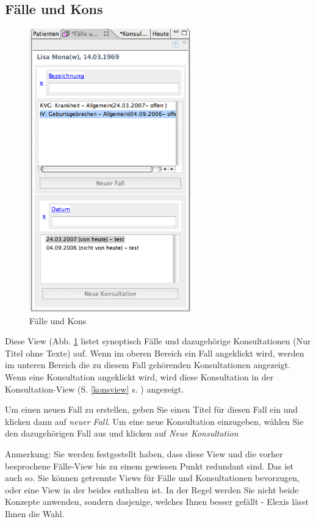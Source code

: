 \subsection{Fälle und Kons}
\begin{figure}
  \includegraphics[width=7cm]{images/fallkonsview}
  \caption{Fälle und Kons}
  \label{fig:fallkons}
\end{figure}
Diese View (Abb. \ref{fig:fallkons} listet synoptisch Fälle und dazugehörige
Konsultationen (Nur Titel ohne Texte) auf. Wenn im oberen Bereich ein Fall
angeklickt wird, werden im unteren Bereich die zu diesem Fall gehörenden
Konsultationen angezeigt. Wenn eine Konsultation angeklickt wird, wird diese
Konsultation in der Konsultation-View (S. \ref{konsview} s. \pageref{konsview}) angezeigt.

Um einen neuen Fall zu erstellen, geben Sie einen Titel für diesen Fall ein und klicken dann auf \textit{neuer Fall}. Um eine neue Konsultation einzugeben, wählen Sie den dazugehörigen Fall aus und klicken auf \textit{Neue Konsultation}

\medskip

Anmerkung: Sie werden festgestellt haben, dass diese View und die vorher besprochene Fälle-View bis zu einem gewissen Punkt redundant sind. Das ist auch so. Sie können getrennte Views für Fälle und Konsultationen bevorzugen, oder eine View in der beides enthalten ist. In der Regel werden Sie nicht beide Konzepte anwenden, sondern dasjenige, welches Ihnen besser gefällt - Elexis lässt Ihnen die Wahl. 

